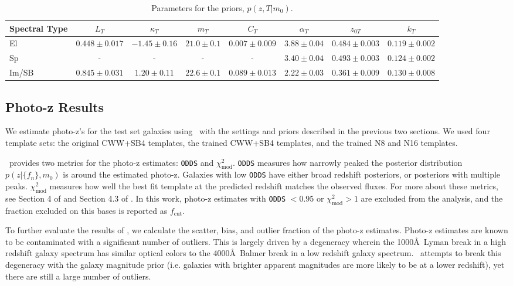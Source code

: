 \begin{table}
    \caption{Parameters for the priors, $p(z,T|m_0)$.}
    \label{tab:prior_params}
    \centering
    \begin{tabular}{l c c c c c c c }
        \hline \hline
         Spectral Type & $L_T$ & $\kappa_T$ & $m_T$ & $C_T$ & $\alpha_T$ & $z_{0T}$ & $k_T$ \\
         \hline
         
         El & $0.448 \pm 0.017$ & $-1.45 \pm 0.16$ & $21.0 \pm 0.1$ & $0.007 \pm 0.009$ & $3.88 \pm 0.04$ & $0.484 \pm 0.003$ & $0.119 \pm 0.002$ \\
         Sp & - & - & - & - & $3.40 \pm 0.04$ & $0.493 \pm 0.003$ & $0.124 \pm 0.002$ \\
         Im/SB & $0.845 \pm 0.031$ & $1.20 \pm 0.11$ & $22.6 \pm 0.1$ & $0.089 \pm 0.013$ & $2.22 \pm 0.03$ & $0.361 \pm 0.009$ & $0.130 \pm 0.008$ \\
        
        \hline
    \end{tabular}
\end{table}


\subsection{Photo-z Results}
\label{sect:photoz_results}

We estimate photo-z's for the test set galaxies using \bpz\ with the settings and priors described in the previous two sections.
We used four template sets: the original CWW+SB4 templates, the trained CWW+SB4 templates, and the trained N8 and N16 templates.

\bpz\ provides two metrics for the photo-z estimates: \texttt{ODDS} and $\chi_{\text{mod}}^2$.
\texttt{ODDS} measures how narrowly peaked the posterior distribution $p(z|\{f_n\},m_0)$ is around the estimated photo-z.
Galaxies with low \texttt{ODDS} have either broad redshift posteriors, or posteriors with multiple peaks.
$\chi_{\text{mod}}^2$ measures how well the best fit template at the predicted redshift matches the observed fluxes. 
For more about these metrics, see Section 4 of \citet{Benitez2000a} and Section 4.3 of \citet{Coe2006a}.
In this work, photo-z estimates with \texttt{ODDS} $< 0.95$ or $\chi_{\text{mod}}^2 > 1$ are excluded from the analysis, and the fraction excluded on this bases is reported as $f_\text{cut}$.

To further evaluate the results of \bpz, we calculate the scatter, bias, and outlier fraction of the photo-z estimates. 
Photo-z estimates are known to be contaminated with a significant number of outliers.
This is largely driven by a degeneracy wherein the 1000\AA\ Lyman break in a high redshift galaxy spectrum has similar optical colors to the 4000\AA\ Balmer break in a low redshift galaxy spectrum. 
\bpz\ attempts to break this degeneracy with the galaxy magnitude prior (i.e. galaxies with brighter apparent magnitudes are more likely to be at a lower redshift), yet there are still a large number of outliers.

